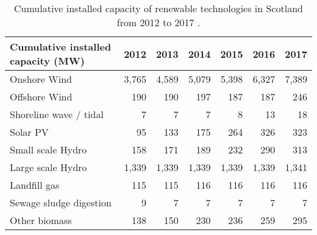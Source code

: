 \begin{table}[H]
	\caption{Cumulative installed capacity of renewable technologies in Scotland from 2012 to 2017 \citep{BEIS2018REs}.}
	\label{tbl:installed_cap}
	\centering
	\begin{tabular}{@{}lrrrrrr@{}}
		\toprule
		Cumulative installed capacity (MW) & 2012 & 2013 & 2014 & 2015 & 2016 & 2017 \\ \midrule
		Onshore Wind & 3,765 & 4,589 & 5,079 & 5,398 & 6,327 & 7,389 \\
		Offshore Wind & 190 & 190 & 197 & 187 & 187 & 246 \\
		Shoreline wave / tidal & 7 & 7 & 7 & 8 & 13 & 18 \\
		Solar PV & 95 & 133 & 175 & 264 & 326 & 323 \\
		Small scale Hydro & 158 & 171 & 189 & 232 & 290 & 313 \\
		Large scale Hydro & 1,339 & 1,339 & 1,339 & 1,339 & 1,339 & 1,341 \\
		Landfill gas & 115 & 115 & 116 & 116 & 116 & 116 \\
		Sewage sludge digestion & 9 & 7 & 7 & 7 & 7 & 7 \\
		Other biomass & 138 & 150 & 230 & 236 & 259 & 295 \\ \bottomrule
	\end{tabular}
\end{table}